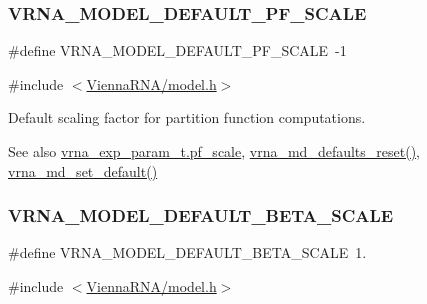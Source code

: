 \subsubsection{\texorpdfstring{V\+R\+N\+A\+\_\+\+M\+O\+D\+E\+L\+\_\+\+D\+E\+F\+A\+U\+L\+T\+\_\+\+P\+F\+\_\+\+S\+C\+A\+LE}{VRNA\_MODEL\_DEFAULT\_PF\_SCALE}}
{\footnotesize\ttfamily \#define V\+R\+N\+A\+\_\+\+M\+O\+D\+E\+L\+\_\+\+D\+E\+F\+A\+U\+L\+T\+\_\+\+P\+F\+\_\+\+S\+C\+A\+LE~-\/1}



{\ttfamily \#include $<$\mbox{\hyperlink{model_8h}{Vienna\+R\+N\+A/model.\+h}}$>$}



Default scaling factor for partition function computations. 

\begin{DoxySeeAlso}{See also}
\mbox{\hyperlink{group__energy__parameters_a53c12f0d74f94ce371e0471a8ab5a377}{vrna\+\_\+exp\+\_\+param\+\_\+t.\+pf\+\_\+scale}}, \mbox{\hyperlink{group__model__details_ga70834424cf804d149937de89f80ceb45}{vrna\+\_\+md\+\_\+defaults\+\_\+reset()}}, \mbox{\hyperlink{group__model__details_ga8ac6ff84936282436f822644bf841f66}{vrna\+\_\+md\+\_\+set\+\_\+default()}} 
\end{DoxySeeAlso}
\mbox{\label{group__model__details_ga383d3ac8d08c3b6221754b50871c1200}} 
\subsubsection{\texorpdfstring{V\+R\+N\+A\+\_\+\+M\+O\+D\+E\+L\+\_\+\+D\+E\+F\+A\+U\+L\+T\+\_\+\+B\+E\+T\+A\+\_\+\+S\+C\+A\+LE}{VRNA\_MODEL\_DEFAULT\_BETA\_SCALE}}
{\footnotesize\ttfamily \#define V\+R\+N\+A\+\_\+\+M\+O\+D\+E\+L\+\_\+\+D\+E\+F\+A\+U\+L\+T\+\_\+\+B\+E\+T\+A\+\_\+\+S\+C\+A\+LE~1.}



{\ttfamily \#include $<$\mbox{\hyperlink{model_8h}{Vienna\+R\+N\+A/model.\+h}}$>$}



